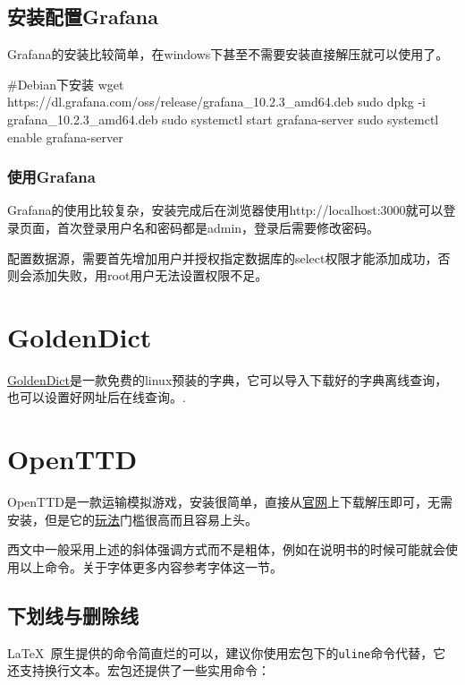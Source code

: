 \subsection{安装配置Grafana}
Grafana的安装比较简单，在windows下甚至不需要安装直接解压就可以使用了。
\begin{shell}
#Debian下安装
wget https://dl.grafana.com/oss/release/grafana_10.2.3_amd64.deb
sudo dpkg -i grafana_10.2.3_amd64.deb
sudo systemctl start grafana-server
sudo systemctl enable grafana-server
\end{shell}
\subsubsection{使用Grafana}
Grafana的使用比较复杂，安装完成后在浏览器使用http://localhost:3000就可以登录页面，首次登录用户名和密码都是admin，登录后需要修改密码。

配置数据源，需要首先增加用户并授权指定数据库的select权限才能添加成功，否则会添加失败，用root用户无法设置权限不足。





\section{GoldenDict}
\href{https://blog.csdn.net/networkhunter/article/details/117127021?spm=1001.2014.3001.5506}{GoldenDict}是一款免费的linux预装的字典，它可以导入下载好的字典离线查询，也可以设置好网址后在线查询。.
\section{OpenTTD}
OpenTTD是一款运输模拟游戏，安装很简单，直接从\href{https://www.openttd.org/}{官网}上下载解压即可，无需安装，但是它的\href{https://wiki.openttd.org/zh/Main Page}{玩法}门槛很高而且容易上头。

西文中一般采用上述的斜体强调方式而不是粗体，例如在说明书的时候可能就会使用以上命令。关于字体更多内容参考字体这一节。

\subsection{下划线与删除线}
\LaTeX\ 原生提供的命令简直烂的可以，建议你使用宏包下的\texttt{uline}命令代替，它还支持换行文本。宏包还提供了一些实用命令：
